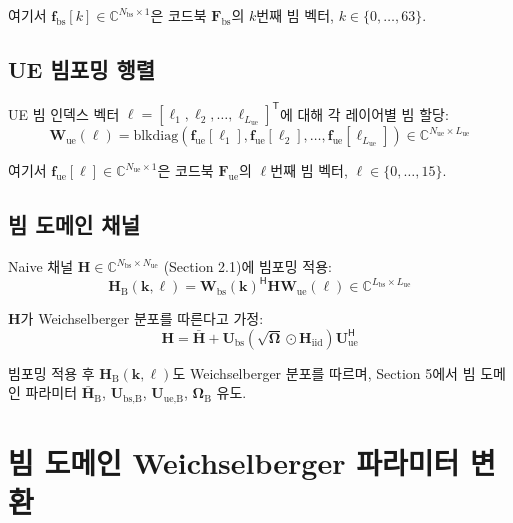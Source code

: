 \documentclass[10pt]{article}
\begin{document}
여기서 $\mathbf{f}_{\text{bs}}[k] \in \mathbb{C}^{N_{\text{bs}} \times 1}$은 코드북 $\mathbf{F}_{\text{bs}}$의 $k$번째 빔 벡터, $k \in \{0, \ldots, 63\}$.

\subsection{UE 빔포밍 행렬}
UE 빔 인덱스 벡터 $\boldsymbol{\ell} = [\ell_1, \ell_2, \ldots, \ell_{L_{\text{ue}}}]^{\mathsf{T}}$에 대해 각 레이어별 빔 할당:
\begin{equation}
\mathbf{W}_{\text{ue}}(\boldsymbol{\ell}) = \text{blkdiag}\left(\mathbf{f}_{\text{ue}}[\ell_1], \mathbf{f}_{\text{ue}}[\ell_2], \ldots, \mathbf{f}_{\text{ue}}[\ell_{L_{\text{ue}}}]\right) \in \mathbb{C}^{N_{\text{ue}} \times L_{\text{ue}}}
\end{equation}

여기서 $\mathbf{f}_{\text{ue}}[\ell] \in \mathbb{C}^{N_{\text{ue}} \times 1}$은 코드북 $\mathbf{F}_{\text{ue}}$의 $\ell$번째 빔 벡터, $\ell \in \{0, \ldots, 15\}$.

\subsection{빔 도메인 채널}
Naive 채널 $\mathbf{H} \in \mathbb{C}^{N_{\text{bs}} \times N_{\text{ue}}}$ (Section 2.1)에 빔포밍 적용:
\begin{equation}
\mathbf{H}_{\text{B}}(\boldsymbol{k}, \boldsymbol{\ell}) = \mathbf{W}_{\text{bs}}(\boldsymbol{k})^{\mathsf{H}} \mathbf{H} \mathbf{W}_{\text{ue}}(\boldsymbol{\ell}) \in \mathbb{C}^{L_{\text{bs}} \times L_{\text{ue}}}
\end{equation}

$\mathbf{H}$가 Weichselberger 분포를 따른다고 가정:
\begin{equation}
\mathbf{H} = \bar{\mathbf{H}} + \mathbf{U}_{\text{bs}} (\sqrt{\boldsymbol{\Omega}} \odot \mathbf{H}_{\text{iid}}) \mathbf{U}_{\text{ue}}^{\mathsf{H}}
\end{equation}

빔포밍 적용 후 $\mathbf{H}_{\text{B}}(\boldsymbol{k}, \boldsymbol{\ell})$도 Weichselberger 분포를 따르며, Section 5에서 빔 도메인 파라미터 $\bar{\mathbf{H}}_{\text{B}}$, $\mathbf{U}_{\text{bs,B}}$, $\mathbf{U}_{\text{ue,B}}$, $\boldsymbol{\Omega}_{\text{B}}$ 유도.

\newpage
\section{빔 도메인 Weichselberger 파라미터 변환}
\end{document}
